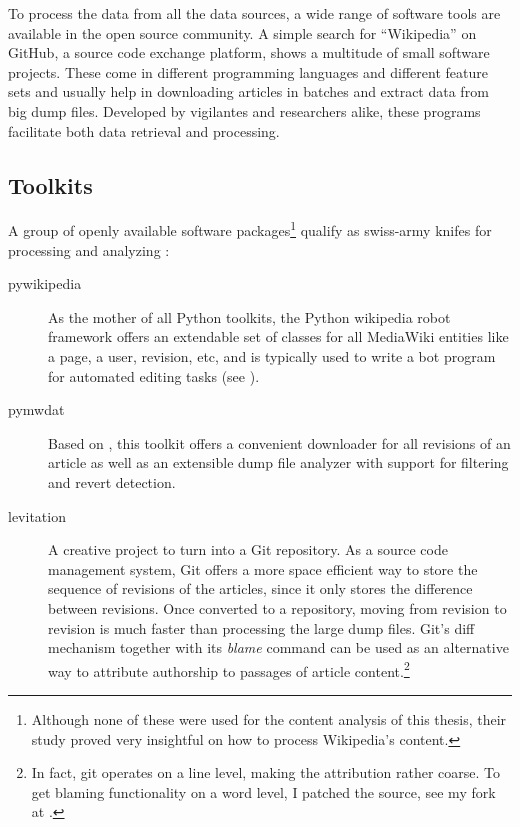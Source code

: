 To process the data from all the data sources, a wide range of software tools are available in the open source community.
A simple search for ``Wikipedia'' on GitHub, a source code exchange platform, shows a multitude of small software projects.
These come in different programming languages and different feature sets and usually help in downloading articles in batches and extract data from big dump files. 
Developed by vigilantes and researchers alike, these programs facilitate both data retrieval and processing.

\subsection{Toolkits}\label{sub:toolkits}

A group of openly available software packages\footnote{Although none of these were used for the content analysis of this thesis, their study proved very insightful on how to process Wikipedia's content.} qualify as swiss-army knifes for processing and analyzing :

\begin{description}
\item[pywikipedia] As the mother of all Python toolkits, the Python wikipedia robot framework offers an extendable set of classes for all MediaWiki entities like a page, a user, revision, etc, and is typically used to write a bot program for automated editing tasks (see ).
\item[pymwdat] Based on , this toolkit offers a convenient downloader for all revisions of an article as well as an extensible dump file analyzer with support for filtering and revert detection.
\item[levitation] A creative project to turn  into a Git repository.
As a source code management system, Git offers a more space efficient way to store the sequence of revisions of the articles, since it only stores the difference between revisions.
Once converted to a repository, moving from revision to revision is much faster than processing the large dump files.
Git's diff mechanism together with its \emph{blame} command can be used as an alternative way to attribute authorship to passages of article content.\footnote{In fact, git operates on a line level, making the attribution rather coarse. To get blaming functionality on a word level, I patched the source, see my fork at .}
\end{description}

